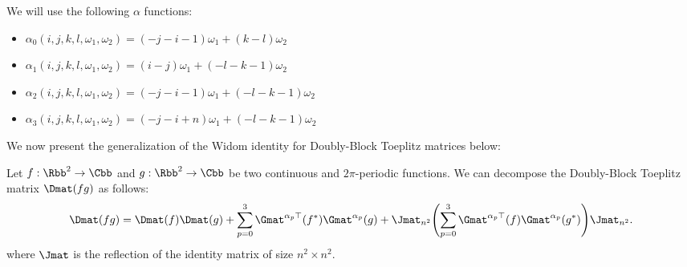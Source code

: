 \noindent
We will use the following $\alpha$ functions:
\begin{itemize}
    \item[] $\alpha_0(i, j, k, l, \omega_1, \omega_2) = (-j-i-1)\omega_1 + (k-l)\omega_2$
    \item[] $\alpha_1(i, j, k, l, \omega_1, \omega_2) = (i-j)\omega_1 + (-l-k-1)\omega_2$
    \item[] $\alpha_2(i, j, k, l, \omega_1, \omega_2) = (-j-i-1)\omega_1 + (-l-k-1)\omega_2$
    \item[] $\alpha_3(i, j, k, l, \omega_1, \omega_2) = (-j-i+n)\omega_1 + (-l-k-1)\omega_2$
\end{itemize}

\noindent
We now present the generalization of the Widom identity for Doubly-Block Toeplitz matrices below:
\begin{lemma} \label{lemma:ap1-widom_idenity}
  Let $f:\Rbb^2 \rightarrow \Cbb$ and $g:\Rbb^2 \rightarrow \Cbb$ be two continuous and $2\pi$-periodic functions. 
  We can decompose the Doubly-Block Toeplitz matrix $\Dmat(fg)$ as follows:
  \begin{equation}
    \Dmat(fg) = \Dmat(f)\Dmat(g) + \sum_{p=0}^3 \Gmat^{\alpha_p \top}(f^*) \Gmat^{\alpha_p}(g) + \Jmat_{n^2} \left( \sum_{p=0}^3 \Gmat^{\alpha_p \top}(f) \Gmat^{\alpha_p }(g^*) \right) \Jmat_{n^2}.
  \end{equation}
  where $\Jmat$ is the reflection of the identity matrix of size $n^2 \times n^2$.
\end{lemma}



